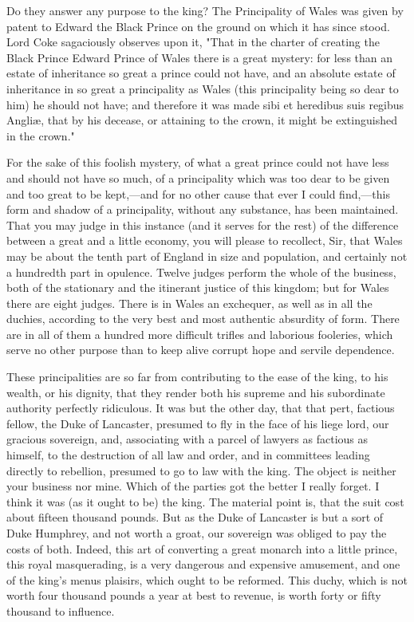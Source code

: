 Do they answer any purpose to the king? The Principality of Wales was given by patent to Edward the Black Prince on the ground on which it has since stood. Lord Coke sagaciously observes upon it, "That in the charter of creating the Black Prince Edward Prince of Wales there is a great mystery: for less than an estate of inheritance so great a prince could not have, and an absolute estate of inheritance in so great a principality as Wales (this principality being so dear to him) he should not have; and therefore it was made sibi et heredibus suis regibus Angliæ, that by his decease, or attaining to the crown, it might be extinguished in the crown."

For the sake of this foolish mystery, of what a great prince could not have less and should not have so much, of a principality which was too dear to be given and too great to be kept,—and for no other cause that ever I could find,—this form and shadow of a principality, without any substance, has been maintained. That you may judge in this instance (and it serves for the rest) of the difference between a great and a little economy, you will please to recollect, Sir, that Wales may be about the tenth part of England in size and population, and certainly not a hundredth part in opulence. Twelve judges perform the whole of the business, both of the stationary and the itinerant justice of this kingdom; but for Wales there are eight judges. There is in Wales an exchequer, as well as in all the duchies, according to the very best and most authentic absurdity of form. There are in all of them a hundred more difficult trifles and laborious fooleries, which serve no other purpose than to keep alive corrupt hope and servile dependence.

These principalities are so far from contributing to the ease of the king, to his wealth, or his dignity, that they render both his supreme and his subordinate authority perfectly ridiculous. It was but the other day, that that pert, factious fellow, the Duke of Lancaster, presumed to fly in the face of his liege lord, our gracious sovereign, and, associating with a parcel of lawyers as factious as himself, to the destruction of all law and order, and in committees leading directly to rebellion, presumed to go to law with the king. The object is neither your business nor mine. Which of the parties got the better I really forget. I think it was (as it ought to be) the king. The material point is, that the suit cost about fifteen thousand pounds. But as the Duke of Lancaster is but a sort of Duke Humphrey, and not worth a groat, our sovereign was obliged to pay the costs of both. Indeed, this art of converting a great monarch into a little prince, this royal masquerading, is a very dangerous and expensive amusement, and one of the king's menus plaisirs, which ought to be reformed. This duchy, which is not worth four thousand pounds a year at best to revenue, is worth forty or fifty thousand to influence.

